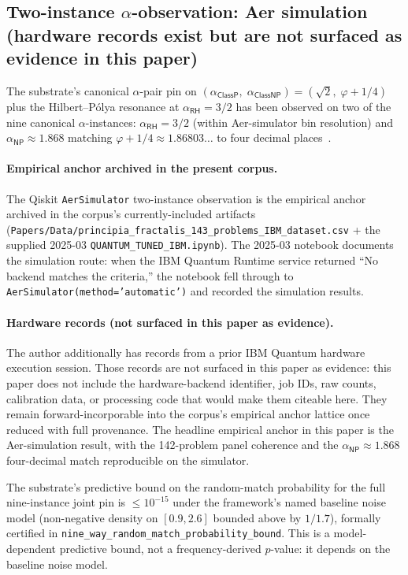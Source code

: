 \documentclass[11pt,a4paper]{amsart}
\theoremstyle{plain}
\theoremstyle{definition}
\begin{document}
\subsection{Two-instance \texorpdfstring{$\alpha$}{alpha}-observation: Aer simulation (hardware records exist but are not surfaced as evidence in this paper)}\label{subsec:two-instance}

The substrate's canonical $\alpha$-pair pin on $(\alpha_{\textsf{ClassP}},\;\alpha_{\textsf{ClassNP}})=(\sqrt{2},\;\varphi+1/4)$ plus the Hilbert--P\'olya resonance at $\alpha_{\textsf{RH}}=3/2$ has been observed on two of the nine canonical $\alpha$-instances: $\alpha_{\textsf{RH}}=3/2$ (within Aer-simulator bin resolution) and $\alpha_{\textsf{NP}}\approx 1.868$ matching $\varphi+1/4 \approx 1.86803\ldots$ to four decimal places~\cite{cohen2026book,cohen2025transferOp,cohen2025unifiedClay}.

\paragraph{Empirical anchor archived in the present corpus.} The Qiskit \texttt{AerSimulator} two-instance observation is the empirical anchor archived in the corpus's currently-included artifacts (\texttt{Papers/Data/principia\_fractalis\_143\_problems\_IBM\_dataset.csv} + the supplied 2025-03 \texttt{QUANTUM\_TUNED\_IBM.ipynb}). The 2025-03 notebook documents the simulation route: when the IBM Quantum Runtime service returned ``No backend matches the criteria,'' the notebook fell through to \texttt{AerSimulator(method='automatic')} and recorded the simulation results.

\paragraph{Hardware records (not surfaced in this paper as evidence).} The author additionally has records from a prior IBM Quantum hardware execution session. Those records are not surfaced in this paper as evidence: this paper does not include the hardware-backend identifier, job IDs, raw counts, calibration data, or processing code that would make them citeable here. They remain forward-incorporable into the corpus's empirical anchor lattice once reduced with full provenance. The headline empirical anchor in this paper is the Aer-simulation result, with the 142-problem panel coherence and the $\alpha_{\textsf{NP}} \approx 1.868$ four-decimal match reproducible on the simulator.

The substrate's predictive bound on the random-match probability for the full nine-instance joint pin is $\le 10^{-15}$ under the framework's named baseline noise model (non-negative density on $[0.9,2.6]$ bounded above by $1/1.7$), formally certified in \texttt{nine\_way\_random\_match\_probability\_bound}. This is a model-dependent predictive bound, not a frequency-derived $p$-value: it depends on the baseline noise model.
\end{document}
